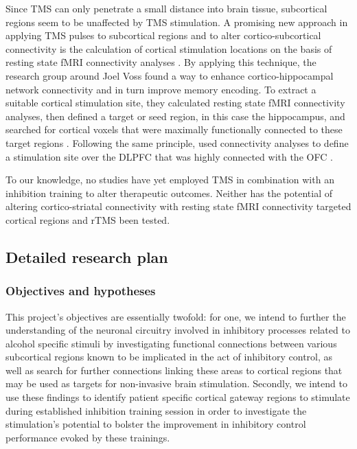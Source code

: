 \documentclass[12pt]{article}
\begin{document}
Since TMS can only penetrate a small distance into brain tissue, subcortical regions seem to be unaffected by TMS stimulation. A promising new approach in applying TMS pulses to subcortical regions and to alter cortico-subcortical connectivity is the calculation of cortical stimulation locations on the basis of resting state fMRI connectivity analyses \parencite{wangTargetedEnhancementCorticalhippocampal2014}. By applying this technique, the research group around Joel Voss found a way to enhance cortico-hippocampal network connectivity and in turn improve memory encoding. To extract a suitable cortical stimulation site, they calculated resting state fMRI connectivity analyses, then defined a target or seed region, in this case the hippocampus, and searched for cortical voxels that were maximally functionally connected to these target regions \parencite{hermillerEvidenceImmediateEnhancement2020}. Following the same principle, \textcite{howardTargetedStimulationHuman2020} used connectivity analyses to define a stimulation site over the DLPFC that was highly connected with the OFC \parencite{howardTargetedStimulationHuman2020}. 

To our knowledge, no studies have yet employed TMS in combination with an inhibition training to alter therapeutic outcomes. Neither has the potential of altering cortico-striatal connectivity with resting state fMRI connectivity targeted cortical regions and rTMS been tested.

\subsection{Detailed research plan}


\subsubsection{Objectives and hypotheses}

This project's objectives are essentially twofold: for one, we intend to further the understanding of the neuronal circuitry involved in inhibitory processes related to alcohol specific stimuli by investigating functional connections between various subcortical regions known to be implicated in the act of inhibitory control, as well as search for further connections linking these areas to cortical regions that may be used as targets for non-invasive brain stimulation. Secondly, we intend to use these findings to identify patient specific cortical gateway regions to stimulate during established inhibition training session in order to investigate the stimulation's potential to bolster the improvement in inhibitory control performance evoked by these trainings.
\end{document}

